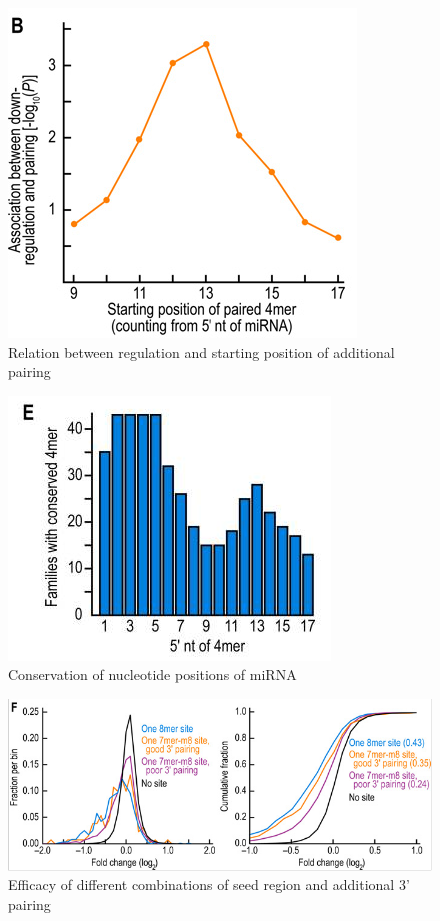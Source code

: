 \documentclass[12pt]{article}
\begin{document}
\begin{figure}[h]
\centering
\includegraphics[scale=0.4]{results/sites_regulation.PNG} 
\caption{Relation between regulation and starting position of additional pairing}
\label{siteregulation}
\end{figure}

\begin{figure}[h]
\centering
\includegraphics[scale=0.5]{results/sites_conserved.PNG} 
\caption{Conservation of nucleotide positions of miRNA}
\label{conserved}
\end{figure}

\begin{figure}[h]
\centering
\includegraphics[scale=0.5]{results/site_efficacy.PNG} 
\caption{Efficacy of different combinations of seed region and additional 3' pairing}
\label{efficacy}
\end{figure}
\end{document}
